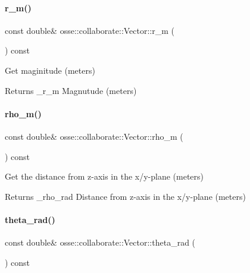 \paragraph{\texorpdfstring{r\+\_\+m()}{r\_m()}}
{\footnotesize\ttfamily const double\& osse\+::collaborate\+::\+Vector\+::r\+\_\+m (\begin{DoxyParamCaption}{ }\end{DoxyParamCaption}) const\hspace{0.3cm}{\ttfamily [inline]}}



Get maginitude (meters) 

\begin{DoxyReturn}{Returns}
\+\_\+r\+\_\+m Magnutude (meters) 
\end{DoxyReturn}
\mbox{\label{classosse_1_1collaborate_1_1_vector_a61bc6a4b1074ca5d69e8eb581128b6a0}} 
\paragraph{\texorpdfstring{rho\+\_\+m()}{rho\_m()}}
{\footnotesize\ttfamily const double\& osse\+::collaborate\+::\+Vector\+::rho\+\_\+m (\begin{DoxyParamCaption}{ }\end{DoxyParamCaption}) const\hspace{0.3cm}{\ttfamily [inline]}}



Get the distance from z-\/axis in the x/y-\/plane (meters) 

\begin{DoxyReturn}{Returns}
\+\_\+rho\+\_\+rad Distance from z-\/axis in the x/y-\/plane (meters) 
\end{DoxyReturn}
\mbox{\label{classosse_1_1collaborate_1_1_vector_aa74ca108111d3b520f5e39407d3c4c0a}} 
\paragraph{\texorpdfstring{theta\+\_\+rad()}{theta\_rad()}}
{\footnotesize\ttfamily const double\& osse\+::collaborate\+::\+Vector\+::theta\+\_\+rad (\begin{DoxyParamCaption}{ }\end{DoxyParamCaption}) const\hspace{0.3cm}{\ttfamily [inline]}}



